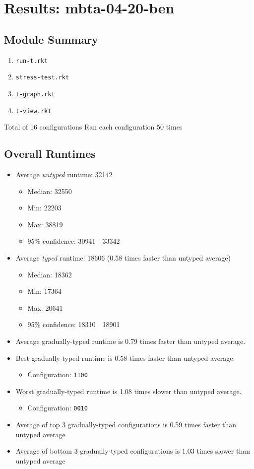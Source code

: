\documentclass{article}
\newcommand{\mono}[1]{\texttt{#1}}
\begin{document}


\section{Results: mbta-04-20-ben}

\subsection{Module Summary}
\begin{enumerate}
\item \mono{run-t.rkt}
\item \mono{stress-test.rkt}
\item \mono{t-graph.rkt}
\item \mono{t-view.rkt}\end{enumerate}
Total of 16 configurations
Ran each configuration 50 times

\subsection{Overall Runtimes}
\begin{itemize}
\item Average \emph{untyped} runtime: 32142
  \begin{itemize}
  \item Median: 32550
  \item Min: 22203
  \item Max: 38819
  \item 95\% confidence: 30941~\textendash~33342\end{itemize}
\item Average \emph{typed} runtime: 18606 (0.58 times faster than untyped average)
  \begin{itemize}
  \item Median: 18362
  \item Min: 17364
  \item Max: 20641
  \item 95\% confidence: 18310~\textendash~18901
\end{itemize}
\item Average gradually-typed runtime is 0.79 times faster than untyped average.
\item Best gradually-typed runtime is 0.58 times faster than untyped average.
\begin{itemize}\item Configuration: \mono{1100}\end{itemize}
\item Worst gradually-typed runtime is 1.08 times slower than untyped average.
\begin{itemize}\item Configuration: \mono{0010}\end{itemize}
\item Average of top 3 gradually-typed configurations is 0.59 times faster than untyped average
\item Average of bottom 3 gradually-typed configurations is 1.03 times slower than untyped average
\end{itemize}
\end{document}
